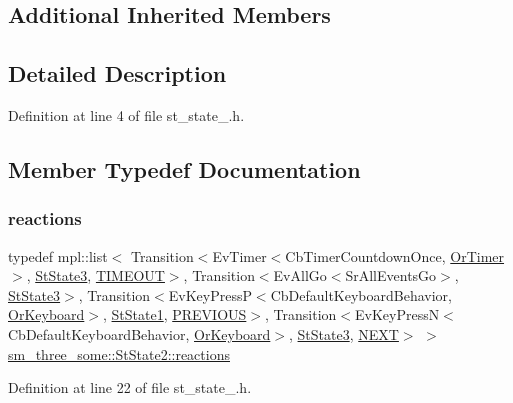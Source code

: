 \subsection*{Additional Inherited Members}


\subsection{Detailed Description}


Definition at line 4 of file st\+\_\+state\+\_.\+h.



\subsection{Member Typedef Documentation}
\mbox{\label{structsm__three__some_1_1StState2_a882f17a676c2edc41d5e3a76c5255c87}} 
\subsubsection{\texorpdfstring{reactions}{reactions}}
{\footnotesize\ttfamily typedef mpl\+::list$<$ Transition$<$Ev\+Timer$<$Cb\+Timer\+Countdown\+Once, \hyperlink{classsm__three__some_1_1OrTimer}{Or\+Timer}$>$, \hyperlink{structsm__three__some_1_1StState3}{St\+State3}, \hyperlink{structsm__three__some_1_1StState2_1_1TIMEOUT}{T\+I\+M\+E\+O\+UT}$>$, Transition$<$Ev\+All\+Go$<$Sr\+All\+Events\+Go$>$, \hyperlink{structsm__three__some_1_1StState3}{St\+State3}$>$, Transition$<$Ev\+Key\+PressP$<$Cb\+Default\+Keyboard\+Behavior, \hyperlink{classsm__three__some_1_1OrKeyboard}{Or\+Keyboard}$>$, \hyperlink{structsm__three__some_1_1StState1}{St\+State1}, \hyperlink{structsm__three__some_1_1StState2_1_1PREVIOUS}{P\+R\+E\+V\+I\+O\+US}$>$, Transition$<$Ev\+Key\+PressN$<$Cb\+Default\+Keyboard\+Behavior, \hyperlink{classsm__three__some_1_1OrKeyboard}{Or\+Keyboard}$>$, \hyperlink{structsm__three__some_1_1StState3}{St\+State3}, \hyperlink{structsm__three__some_1_1StState2_1_1NEXT}{N\+E\+XT}$>$ $>$ \hyperlink{structsm__three__some_1_1StState2_a882f17a676c2edc41d5e3a76c5255c87}{sm\+\_\+three\+\_\+some\+::\+St\+State2\+::reactions}}



Definition at line 22 of file st\+\_\+state\+\_.\+h.



